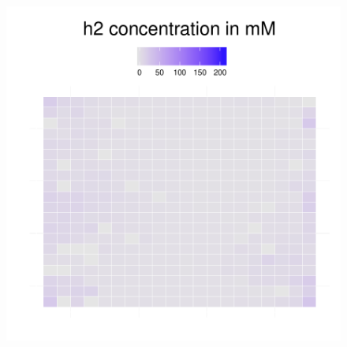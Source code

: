 \begin{figure}[h!]
{\begin{minipage}[t]{0.3\textwidth}
  \end{minipage}
  \begin{minipage}[t]{0.3\textwidth}
    \includegraphics[width=\textwidth]{../results/img/barkeri_beijerinckii_20x20_seed2942_h2150.pdf}
  \end{minipage}
  }
\end{figure}
